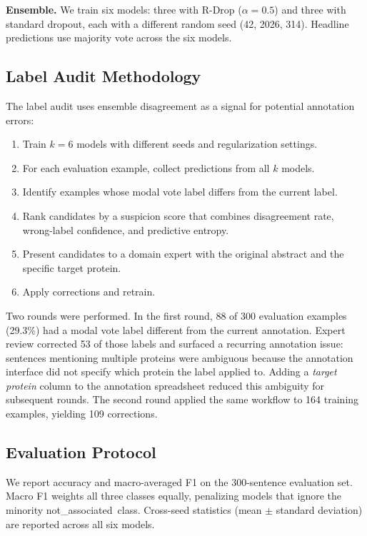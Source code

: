 \documentclass[sn-basic,pdflatex]{sn-jnl}
\newcommand{\RunInHeading}[1]{\par\smallskip\noindent\textbf{#1}\enspace\ignorespaces}
\newcommand{\ClassLabel}[1]{\mbox{\textup{#1}}}
\newcommand{\notassociated}{\ClassLabel{not\_associated}}
\begin{document}
\RunInHeading{Ensemble.}
We train six models: three with R-Drop ($\alpha = 0.5$) and three with standard dropout, each with a different random seed (42, 2026, 314).
Headline predictions use majority vote across the six models.

\subsection{Label Audit Methodology}
\label{sec:audit}

The label audit uses ensemble disagreement as a signal for potential annotation errors:

\begin{enumerate}
  \item Train $k = 6$ models with different seeds and regularization settings.
  \item For each evaluation example, collect predictions from all $k$ models.
  \item Identify examples whose modal vote label differs from the current label.
  \item Rank candidates by a suspicion score that combines disagreement rate, wrong-label confidence, and predictive entropy.
  \item Present candidates to a domain expert with the original abstract and the specific target protein.
  \item Apply corrections and retrain.
\end{enumerate}

Two rounds were performed. In the first round, 88 of 300 evaluation examples (29.3\%) had a modal vote label different from the current annotation. Expert review corrected 53 of those labels and surfaced a recurring annotation issue: sentences mentioning multiple proteins were ambiguous because the annotation interface did not specify which protein the label applied to. Adding a \emph{target protein} column to the annotation spreadsheet reduced this ambiguity for subsequent rounds. The second round applied the same workflow to 164 training examples, yielding 109 corrections.

\subsection{Evaluation Protocol}

We report accuracy and macro-averaged F1 on the 300-sentence evaluation set.
Macro F1 weights all three classes equally, penalizing models that ignore the minority \notassociated\ class.
Cross-seed statistics (mean $\pm$ standard deviation) are reported across all six models.
\end{document}
